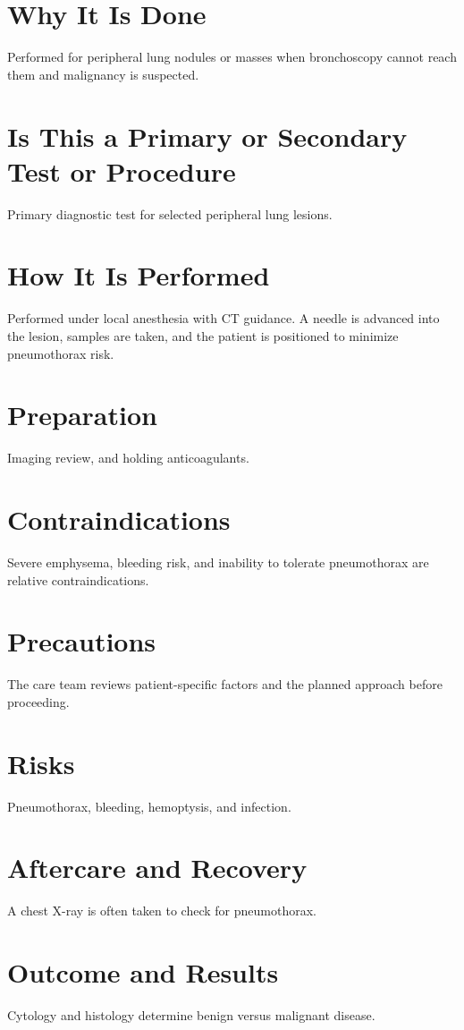 \section*{Why It Is Done}
Performed for peripheral lung nodules or masses when bronchoscopy cannot reach them and malignancy is suspected.

\section*{Is This a Primary or Secondary Test or Procedure}
Primary diagnostic test for selected peripheral lung lesions.

\section*{How It Is Performed}
Performed under local anesthesia with CT guidance. A needle is advanced into the lesion, samples are taken, and the patient is positioned to minimize pneumothorax risk.

\section*{Preparation}
Imaging review, and holding anticoagulants.

\section*{Contraindications}
Severe emphysema, bleeding risk, and inability to tolerate pneumothorax are relative contraindications.

\section*{Precautions}
The care team reviews patient-specific factors and the planned approach before proceeding.

\section*{Risks}
Pneumothorax, bleeding, hemoptysis, and infection.

\section*{Aftercare and Recovery}
A chest X-ray is often taken to check for pneumothorax.

\section*{Outcome and Results}
Cytology and histology determine benign versus malignant disease.

